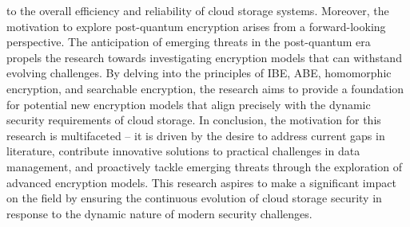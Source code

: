 to the overall efficiency and reliability of cloud storage systems.
Moreover, the motivation to explore post-quantum encryption arises from a forward-looking
perspective. The anticipation of emerging threats in the post-quantum era propels the research
towards investigating encryption models that can withstand evolving challenges. By delving into
the principles of IBE, ABE, homomorphic encryption, and searchable encryption, the research aims
to provide a foundation for potential new encryption models that align precisely with the dynamic
security requirements of cloud storage.
In conclusion, the motivation for this research is multifaceted – it is driven by the desire to address
current gaps in literature, contribute innovative solutions to practical challenges in data
management, and proactively tackle emerging threats through the exploration of advanced
encryption models. This research aspires to make a significant impact on the field by ensuring the
continuous evolution of cloud storage security in response to the dynamic nature of modern security
challenges. 
\clearpage
